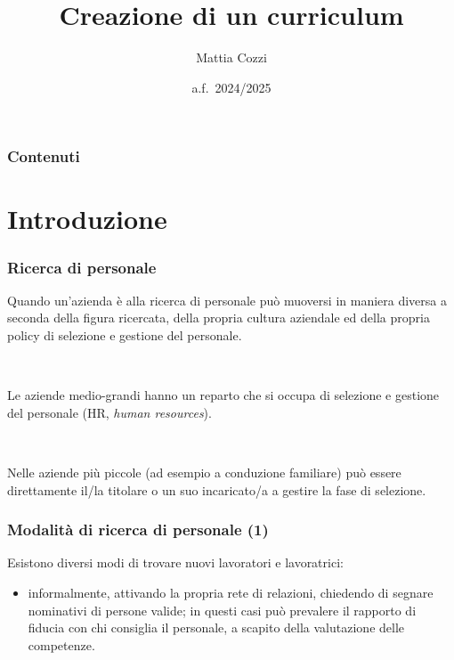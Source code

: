 \documentclass[handout]{beamer}
\title{Creazione di un curriculum}
\author{Mattia Cozzi}
\date{a.f.~2024/2025}
\begin{document}
\begin{frame}
  \titlepage
\end{frame}


\begin{frame}
\frametitle{Contenuti}
\tableofcontents
\end{frame}



\section{Introduzione}


\begin{frame}
\frametitle{Ricerca di personale}
Quando un'azienda è alla ricerca di personale \alert{può muoversi in maniera diversa} a seconda della figura ricercata, della propria cultura aziendale ed della propria policy di selezione e gestione del personale.\pause

~

Le aziende medio-grandi hanno un reparto che si occupa di selezione e gestione del personale (\alert{HR}, \emph{human resources}).\pause

~

Nelle aziende più piccole (ad esempio a conduzione familiare) può essere direttamente il/la titolare o un suo incaricato/a a gestire la fase di selezione.
\end{frame}

\begin{frame}
\frametitle{Modalità di ricerca di personale (1)}
Esistono diversi modi di trovare nuovi lavoratori e lavoratrici:
\begin{itemize}
  \item \alert{informalmente}, attivando la propria rete di relazioni, chiedendo di segnare nominativi di persone valide;{\pause} in questi casi può prevalere il rapporto di fiducia con chi consiglia il personale, a scapito della valutazione delle competenze.
\end{itemize}
\end{frame}
\end{document}
